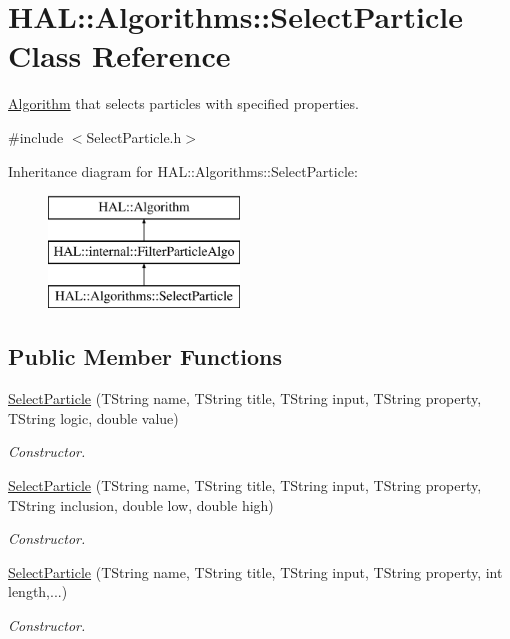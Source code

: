 \hypertarget{class_h_a_l_1_1_algorithms_1_1_select_particle}{\section{H\+A\+L\+:\+:Algorithms\+:\+:Select\+Particle Class Reference}
\label{class_h_a_l_1_1_algorithms_1_1_select_particle}
}


\hyperlink{class_h_a_l_1_1_algorithm}{Algorithm} that selects particles with specified properties.  




{\ttfamily \#include $<$Select\+Particle.\+h$>$}

Inheritance diagram for H\+A\+L\+:\+:Algorithms\+:\+:Select\+Particle\+:\begin{figure}[H]
\begin{center}
\leavevmode
\includegraphics[height=3.000000cm]{class_h_a_l_1_1_algorithms_1_1_select_particle}
\end{center}
\end{figure}
\subsection*{Public Member Functions}
\begin{DoxyCompactItemize}
\item 
\hyperlink{class_h_a_l_1_1_algorithms_1_1_select_particle_a54e0c4f2c30c5dadd99c92c2d74ed37c}{Select\+Particle} (T\+String name, T\+String title, T\+String input, T\+String property, T\+String logic, double value)
\begin{DoxyCompactList}\small\item\em Constructor. \end{DoxyCompactList}\item 
\hyperlink{class_h_a_l_1_1_algorithms_1_1_select_particle_a66727ef056247051056804562276ff84}{Select\+Particle} (T\+String name, T\+String title, T\+String input, T\+String property, T\+String inclusion, double low, double high)
\begin{DoxyCompactList}\small\item\em Constructor. \end{DoxyCompactList}\item 
\hyperlink{class_h_a_l_1_1_algorithms_1_1_select_particle_a0eaa8644614c2d1d2db3b79e5c189a9a}{Select\+Particle} (T\+String name, T\+String title, T\+String input, T\+String property, int length,...)
\begin{DoxyCompactList}\small\item\em Constructor. \end{DoxyCompactList}\end{DoxyCompactItemize}
